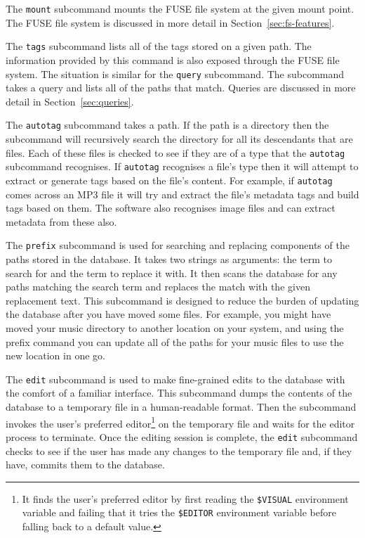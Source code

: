 The \texttt{mount} subcommand mounts the FUSE file system at the given mount
point. The FUSE file system is discussed in more detail in
Section~\ref{sec:fs-features}.

The \texttt{tags} subcommand lists all of the tags stored on a given path. The
information provided by this command is also exposed through the FUSE file
system. The situation is similar for the \texttt{query} subcommand. The
subcommand takes a query and lists all of the paths that match. Queries are
discussed in more detail in Section~\ref{sec:queries}.

The \texttt{autotag} subcommand takes a path. If the path is a directory then
the subcommand will recursively search the directory for all its descendants
that are files. Each of these files is checked to see if they are of a type
that the \texttt{autotag} subcommand recognises. If \texttt{autotag} recognises
a file's type then it will attempt to extract or generate tags based on the
file's content. For example, if \texttt{autotag} comes across an MP3 file it
will try and extract the file's metadata tags and build tags based on them.
 The software also recognises image files and can extract
metadata from these also. 

The \texttt{prefix} subcommand is used for searching and replacing components
of the paths stored in the database. It takes two strings as arguments: the
term to search for and the term to replace it with. It then scans the database
for any paths matching the search term and replaces the match with the given
replacement text. This subcommand is designed to reduce the burden of updating
the database after you have moved some files. For example, you might have moved
your music directory to another location on your system, and using the prefix
command you can update all of the paths for your music files to use the new
location in one go.

The \texttt{edit} subcommand is used to make fine-grained edits to the database
with the comfort of a familiar interface. This subcommand dumps the contents of
the database to a temporary file in a human-readable format. Then the
subcommand invokes the user's preferred editor\footnote{It finds the user's
preferred editor by first reading the \texttt{\$VISUAL} environment variable and
failing that it tries the \texttt{\$EDITOR} environment variable before falling
back to a default value.} on the temporary file and waits for the editor
process to terminate. Once the editing session is complete, the \texttt{edit}
subcommand checks to see if the user has made any changes to the temporary
file and, if they have, commits them to the database.

